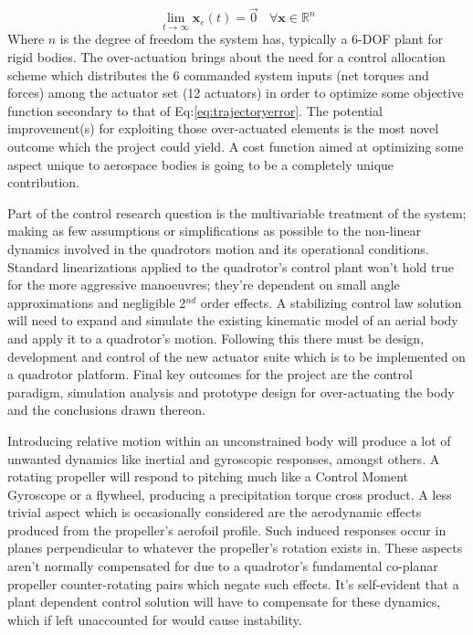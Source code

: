 \begin{equation} \label{eq:trajectoryerror}
\lim_{t \rightarrow \infty} \mathbf{x}_e(t) = \vec{0}~~~~\forall \mathbf{x} \in \mathbb{R}^n
\end{equation}
Where $n$ is the degree of freedom the system has, typically a 6-DOF plant for rigid bodies. The over-actuation brings about the need for a control allocation scheme which distributes the 6 commanded system inputs (net torques and forces) among the actuator set (12 actuators) in order to optimize some objective function secondary to that of Eq:\ref{eq:trajectoryerror}. The potential improvement(s) for exploiting those over-actuated elements is the most novel outcome which the project could yield. A cost function aimed at optimizing some aspect unique to aerospace bodies is going to be a completely unique contribution.
\par
Part of the control research question is the multivariable treatment of the system; making as few assumptions or simplifications as possible to the non-linear dynamics involved in the quadrotors motion and its operational conditions. Standard linearizations applied to the quadrotor's control plant won't hold true for the more aggressive manoeuvres; they're dependent on small angle approximations and negligible 2$^{nd}$ order effects. A stabilizing control law solution will need to expand and simulate the existing kinematic model of an aerial body and apply it to a quadrotor's motion. Following this there must be design, development and control of the new actuator suite which is to be implemented on a quadrotor platform. Final key outcomes for the project are the control paradigm, simulation analysis and prototype design for over-actuating the body and the conclusions drawn thereon.
\par
Introducing relative motion within an unconstrained body will produce a lot of unwanted dynamics like inertial and gyroscopic responses, amongst others. A rotating propeller will respond to pitching much like a Control Moment Gyroscope \cite{cmg} or a flywheel, producing a precipitation torque cross product. A less trivial aspect which is occasionally considered are the aerodynamic effects produced from the propeller's aerofoil profile. Such induced responses occur in planes perpendicular to whatever the propeller's rotation exists in. These aspects aren't normally compensated for due to a quadrotor's fundamental co-planar propeller counter-rotating pairs which negate such effects. It's self-evident that a plant dependent control solution will have to compensate for these dynamics, which if left unaccounted for would cause instability.
